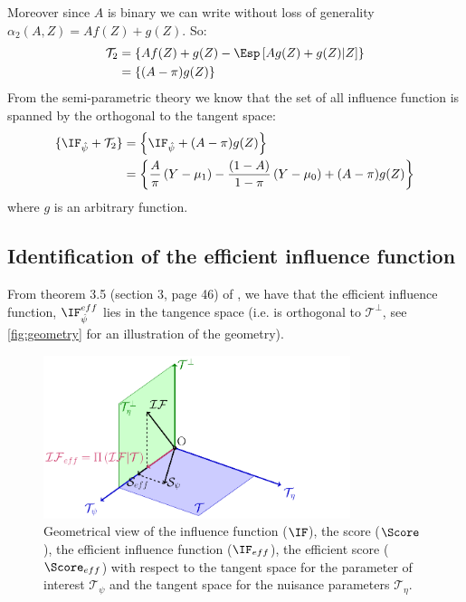 \documentclass[12pt]{article}
\newcommand\Tspace{\mathcal{T}}
\begin{document}
Moreover since \(A\) is binary we can write without loss of generality
\(\alpha_2(A,Z)=Af(Z)+g(Z)\). So:
\begin{align*}
\Tspace_2 &= \left\{Af(Z) + g(Z) - \Esp\left[ Ag(Z) + g(Z) | Z \right] \right\} \\
          &= \left\{(A-\pi)g(Z)  \right\} 
\end{align*}
From the semi-parametric theory we know that the set of all influence
function is spanned by the orthogonal to the tangent space:
\begin{align*}
\{\IF_{\hat{\psi}} + \Tspace_2 \} &= \left\{\IF_{\hat{\psi}} + (A-\pi)g(Z)  \right\}  \\
&= \left\{\frac{A}{\pi} \left(Y - \mu_1\right) - \frac{(1-A)}{1-\pi}\left(Y - \mu_0\right) + (A-\pi)g(Z)  \right\}  
\end{align*}
where \(g\) is an arbitrary function.

\subsection{Identification of the efficient influence function}
\label{sec:org9d92ec5}

From theorem 3.5 (section 3, page 46) of
\cite{tsiatis2007semiparametric}, we have that the efficient influence
function, \(\IF^{eff}_{\hat{\psi}}\) lies in the tangence space
(i.e. is orthogonal to \(\Tspace^{\perp}\), see \autoref{fig:geometry} for an illustration of the geometry).

\begin{figure}[!h]
\centering
\includegraphics[width=0.8\textwidth]{./Figures/geometry.pdf}
\caption{\label{fig:geometry}Geometrical view of the influence function (\(\IF\)), the score (\(\Score\)), the efficient influence function (\(\IF_{eff}\)), the efficient score (\(\Score_{eff}\)) with respect to the tangent space for the parameter of interest \(\Tspace_{\psi}\) and the tangent space for the nuisance parameters \(\Tspace_{\eta}\).}
\end{figure}
\end{document}
